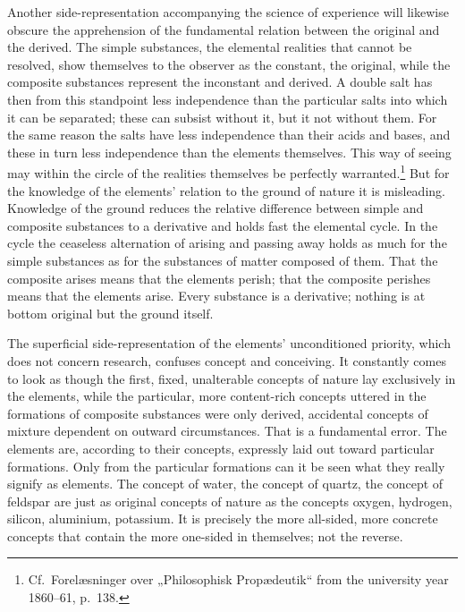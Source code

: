 \documentclass[12pt,a4paper]{book}
\begin{document}
Another side-representation accompanying the science of experience will likewise obscure the apprehension of the
fundamental relation between the original and the derived. The simple substances, the elemental realities that
cannot be resolved, show themselves to the observer
as the constant, the original, while the composite substances represent the inconstant and derived. A double salt
has then from this standpoint less independence than the particular salts into which it can be separated; these can
subsist without it, but it not without them. For the same reason the salts have less independence than their acids
and bases, and these in turn less independence than the elements themselves. This way of seeing
may within the circle of the realities themselves be perfectly warranted.\footnote{%
Cf.\ Forelæsninger over „Philosophisk Propædeutik“ from the university year 1860--61, p.\ 138.} But for the
knowledge of the elements' relation to the ground of nature it is misleading. Knowledge of the ground reduces the
relative difference between simple and composite substances to a derivative and holds fast the elemental cycle. In
the cycle the ceaseless alternation of arising and passing away holds as much for the simple substances as for the
substances of matter composed of them. That the composite arises means that the elements perish; that the composite
perishes means that the elements arise. Every substance is a derivative; nothing is at bottom original but the
ground itself.

The superficial side-representation of the elements' unconditioned priority, which does not concern research,
confuses concept and conceiving. It constantly comes to look as though the first, fixed, unalterable concepts of
nature lay exclusively in the elements, while the particular, more content-rich concepts uttered in the formations
of composite substances were only derived, accidental concepts of mixture dependent on outward circumstances. That is
a fundamental error. The elements are, according to their concepts, expressly laid out toward particular formations.
Only from the particular formations can it be seen what they really signify as elements. The concept of water,
the concept of quartz, the concept of feldspar are just as original concepts of nature as the concepts oxygen,
hydrogen, silicon, aluminium, potassium. It is precisely the more all-sided, more concrete concepts that contain the
more one-sided in themselves; not the reverse.
\end{document}
